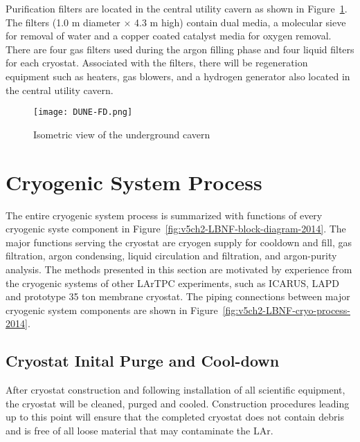 

Purification filters are located in the central utility cavern 
as shown in Figure~\ref{fig:det-cavern-purif}. The filters (1.0 m
diameter $\times$ 4.3 m high) contain dual media, a molecular 
sieve for removal of water and a copper coated catalyst media 
for oxygen removal. There are four gas filters used during 
the argon filling phase and four liquid filters for each cryostat. 
Associated with the filters, there will be regeneration 
equipment such as heaters, gas blowers, and a hydrogen
generator also located in the central utility cavern.

\begin{figure}[htbp]
\centering
\texttt{[image: DUNE-FD.png]} 
\caption{Isometric view of the underground cavern}
\label{fig:det-cavern-purif}
\end{figure}


\chapter{Cryogenic System Process}
\label{sec:cryo-cryosys-proc}
The entire cryogenic system process is summarized with functions of 
every cryogenic syste component in 
Figure~\ref{fig:v5ch2-LBNF-block-diagram-2014}.  
The major functions serving the cryostat are cryogen supply for 
cooldown and fill, gas filtration, argon condensing, liquid 
circulation and filtration, and argon-purity analysis. 
The methods presented in this section are motivated by
experience from the cryogenic systems of other LArTPC 
experiments, such as ICARUS, LAPD and prototype 35 ton 
membrane cryostat. The piping
connections between major cryogenic system components 
are shown in Figure~\ref{fig:v5ch2-LBNF-cryo-process-2014}.

\section{Cryostat Inital Purge and Cool-down}

After cryostat construction and following installation of all 
scientific equipment, the cryostat will be cleaned, purged and 
cooled. Construction procedures leading up to this point will
ensure that the completed cryostat does not contain debris and is free
of all loose material that may contaminate the LAr.

